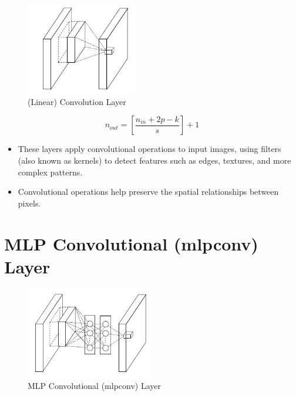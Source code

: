 \begin{table}[h]
    \begin{minipage}{0.44\linewidth}
        \begin{figure}[H]
            \centering
            \includegraphics[width=\linewidth, height=4cm, keepaspectratio]{Pictures/layers/conv-layer-linear.jpg}
            \caption{(Linear) Convolution Layer \cite{medium/towardsdatascience.com/review-nin-network-in-network-image-classification-69e271e499ee}}
        \end{figure}
    \end{minipage}
    \hfill
    \begin{minipage}{0.54\linewidth}
        \[
           \displaystyle n_{out} = \left[ \frac{n_{in} + 2p - k}{s} \right] + 1
        \]
        
        \begin{itemize}
            \item These layers apply convolutional operations to input images, using filters (also known as kernels) to detect features such as edges, textures, and more complex patterns. 
            
            \item Convolutional operations help preserve the spatial relationships between pixels.
        \end{itemize}
    \end{minipage}
\end{table}


\section{MLP Convolutional (mlpconv) Layer \cite{medium/towardsdatascience.com/review-nin-network-in-network-image-classification-69e271e499ee}}

\begin{figure}[h]
    \centering
    \includegraphics[width=\linewidth, height=4cm, keepaspectratio]{Pictures/layers/conv-layer-mlp.jpg}
    \caption{MLP Convolutional (mlpconv) Layer}
\end{figure}



